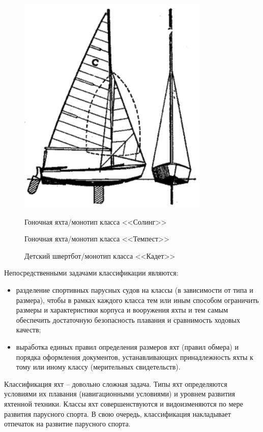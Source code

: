 \documentclass[a4paper, 12pt, twoside, final]{scrbook}
\begin{document}
\begin{figure}[htbp]
	\hfill{}\includegraphics[scale=0.7]{Kadet}%
	\hfill{}

	\hfill{}%
	\begin{minipage}[t]{0.3\columnwidth}%
		\protect\caption{\label{fig:22}Гоночная яхта\-/монотип класса <<Солинг>>}%
	\end{minipage}%
	\hfill{}%
	\begin{minipage}[t]{0.3\columnwidth}%
		\protect\caption{\label{fig:23}Гоночная яхта\-/монотип класса <<Темпест>>}%
	\end{minipage}%
	\hfill{}%
	\begin{minipage}[t]{0.3\columnwidth}%
		\protect\caption{\label{fig:24}Детский швертбот\-/монотип класса <<Кадет>>}%
	\end{minipage}%
	\hfill{}
\end{figure}


Непосредственными задачами классификации являются:
\begin{itemize}
\item разделение спортивных парусных судов на классы (в зависимости от типа
и размера), чтобы в рамках каждого класса тем или иным способом ограничить
размеры и характеристики корпуса и вооружения яхты и тем самым обеспечить
достаточную безопасность плавания и сравнимость ходовых качеств;
\item выработка единых правил определения размеров яхт (правил обмера) и
порядка оформления документов, устанавливающих принадлежность яхты
к тому или иному классу (мерительных свидетельств).
\end{itemize}
Классификация яхт \--- довольно сложная задача. Типы яхт определяются
условиями их плавания (навигационными условиями) и уровнем развития
яхтенной техники. Классы яхт совершенствуются и видоизменяются по
мере развития парусного спорта. В свою очередь, классификация накладывает
отпечаток на развитие парусного спорта.
\end{document}
